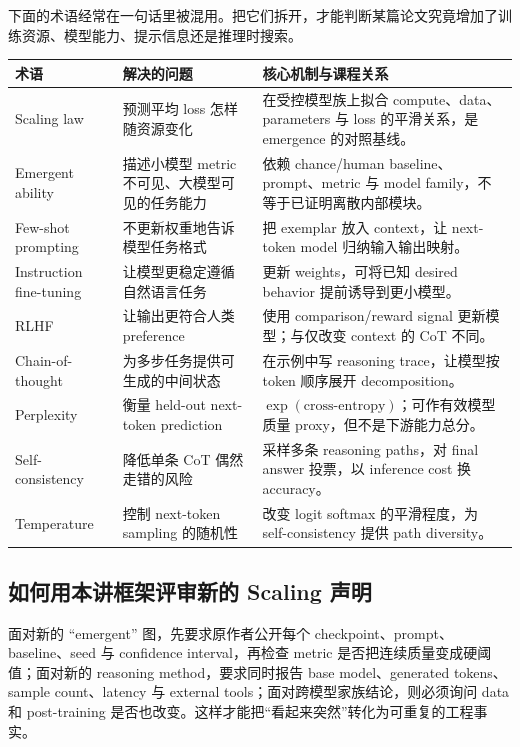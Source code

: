 \documentclass[a4paper]{article}
\begin{document}
下面的术语经常在一句话里被混用。把它们拆开，才能判断某篇论文究竟增加了训练资源、模型能力、提示信息还是推理时搜索。

\begin{longtable}{L{0.19\textwidth}L{0.32\textwidth}L{0.40\textwidth}}
\toprule
\textbf{术语} & \textbf{解决的问题} & \textbf{核心机制与课程关系} \\
\midrule
\endhead
Scaling law & 预测平均 loss 怎样随资源变化 & 在受控模型族上拟合 compute、data、parameters 与 loss 的平滑关系，是 emergence 的对照基线。 \\
Emergent ability & 描述小模型 metric 不可见、大模型可见的任务能力 & 依赖 chance/human baseline、prompt、metric 与 model family，不等于已证明离散内部模块。 \\
Few-shot prompting & 不更新权重地告诉模型任务格式 & 把 exemplar 放入 context，让 next-token model 归纳输入输出映射。 \\
Instruction fine-tuning & 让模型更稳定遵循自然语言任务 & 更新 weights，可将已知 desired behavior 提前诱导到更小模型。 \\
RLHF & 让输出更符合人类 preference & 使用 comparison/reward signal 更新模型；与仅改变 context 的 CoT 不同。 \\
Chain-of-thought & 为多步任务提供可生成的中间状态 & 在示例中写 reasoning trace，让模型按 token 顺序展开 decomposition。 \\
Perplexity & 衡量 held-out next-token prediction & $\exp(\text{cross-entropy})$；可作有效模型质量 proxy，但不是下游能力总分。 \\
Self-consistency & 降低单条 CoT 偶然走错的风险 & 采样多条 reasoning paths，对 final answer 投票，以 inference cost 换 accuracy。 \\
Temperature & 控制 next-token sampling 的随机性 & 改变 logit softmax 的平滑程度，为 self-consistency 提供 path diversity。 \\
\bottomrule
\end{longtable}

\subsection{如何用本讲框架评审新的 Scaling 声明}

面对新的 ``emergent'' 图，先要求原作者公开每个 checkpoint、prompt、baseline、seed 与 confidence interval，再检查 metric 是否把连续质量变成硬阈值；面对新的 reasoning method，要求同时报告 base model、generated tokens、sample count、latency 与 external tools；面对跨模型家族结论，则必须询问 data 和 post-training 是否也改变。这样才能把“看起来突然”转化为可重复的工程事实。
\end{document}
